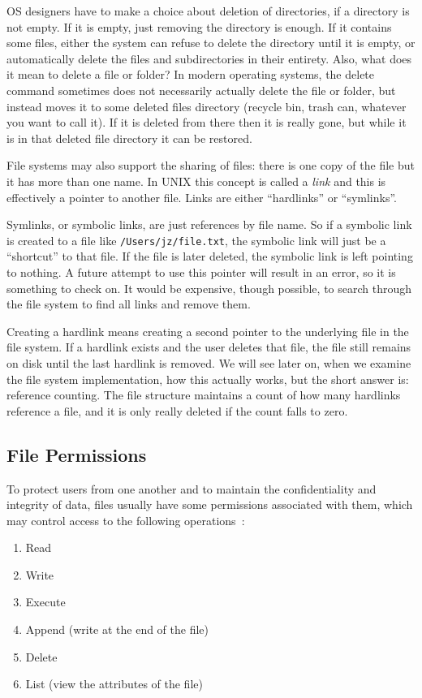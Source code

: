 \documentclass[a4paper]{report}
\begin{document}
OS designers have to make a choice about deletion of directories, if a directory is not empty. If it is empty, just removing the directory is enough. If it contains some files, either the system can refuse to delete the directory until it is empty, or automatically delete the files and subdirectories in their entirety. Also, what does it mean to delete a file or folder? In modern operating systems, the delete command sometimes does not necessarily actually delete the file or folder, but instead moves it to some deleted files directory (recycle bin, trash can, whatever you want to call it). If it is deleted from there then it is really gone, but while it is in that deleted file directory it can be restored.

File systems may also support the sharing of files: there is one copy of the file but it has more than one name. In UNIX this concept is called a \textit{link} and this is effectively a pointer to another file. Links are either ``hardlinks'' or ``symlinks''.

Symlinks, or symbolic links, are just references by file name. So if a symbolic link is created to a file like \texttt{/Users/jz/file.txt}, the symbolic link will just be a ``shortcut'' to that file. If the file is later deleted, the symbolic link is left pointing to nothing. A future attempt to use this pointer will result in an error, so it is something to check on. It would be expensive, though possible, to search through the file system to find all links and remove them.

Creating a hardlink means creating a second pointer to the underlying file in the file system. If a hardlink exists and the user deletes that file, the file still remains on disk until the last hardlink is removed. We will see later on, when we examine the file system implementation, how this actually works, but the short answer is: reference counting. The file structure maintains a count of how many hardlinks reference a file, and it is only really deleted if the count falls to zero.

\subsection*{File Permissions}
To protect users from one another and to maintain the confidentiality and integrity of data, files usually have some permissions associated with them, which may control access to the following operations~\cite{osc}:

\begin{enumerate}
	\item Read
	\item Write
	\item Execute
	\item Append (write at the end of the file)
	\item Delete
	\item List (view the attributes of the file)
\end{enumerate}
\end{document}
